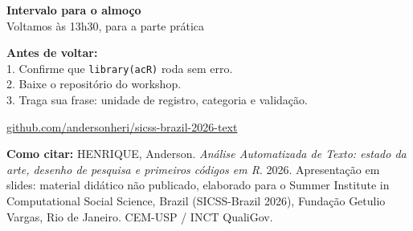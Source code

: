 \documentclass[11pt,aspectratio=169]{beamer}
\begin{document}
\begin{frame}[plain]
\centering
\vspace{0.9cm}
{\Large \textbf{Intervalo para o almoço}}\\[0.45cm]
{\large Voltamos às 13h30, para a parte prática}\\[0.7cm]

\small
\parbox{0.8\textwidth}{\centering
\textbf{Antes de voltar:}\\[0.18cm]
1. Confirme que \texttt{library(acR)} roda sem erro.\\
2. Baixe o repositório do workshop.\\
3. Traga sua frase: unidade de registro, categoria e validação.}
\vspace{0.7cm}

\footnotesize
\url{github.com/andersonheri/sicss-brazil-2026-text}\\[0.45cm]

\parbox{0.85\textwidth}{\scriptsize
\textbf{Como citar:} HENRIQUE, Anderson. \textit{Análise Automatizada de Texto:
estado da arte, desenho de pesquisa e primeiros códigos em R}. 2026.
Apresentação em slides: material didático não publicado, elaborado para o
Summer Institute in Computational Social Science, Brazil (SICSS-Brazil 2026),
Fundação Getulio Vargas, Rio de Janeiro. CEM-USP / INCT QualiGov.}

\end{frame}
\end{document}
